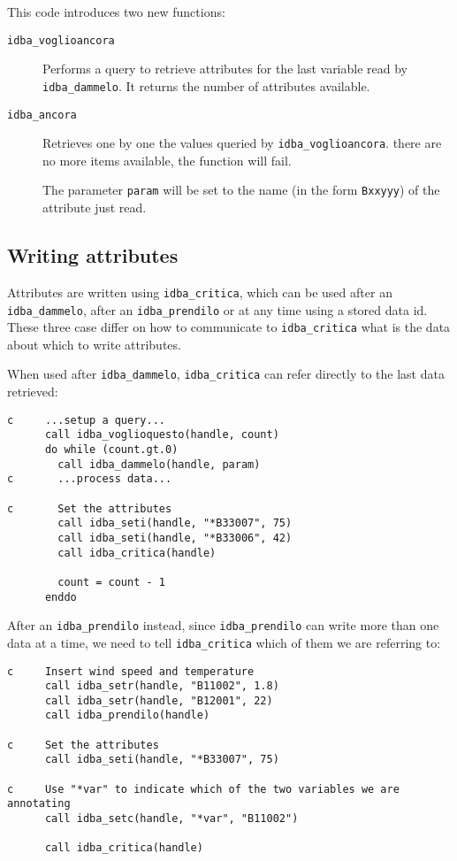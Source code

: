 \documentclass[draft,12pt,a4paper,twoside]{book}
\begin{document}
This code introduces two new functions:

\begin{description}
\item[{\tt idba\_voglioancora}]
  Performs a query to retrieve attributes for the last variable read by
  {\tt idba\_dammelo}.  It returns the number of attributes available.
\item[{\tt idba\_ancora}]
  Retrieves one by one the values queried by {\tt idba\_voglioancora}.
  there are no more items available, the function will fail.

  The parameter {\tt param} will be set to the name (in the form {\tt *Bxxyyy}) of
  the attribute just read.
\end{description}

\subsection{Writing attributes}

\label{fun-idba_critica}

Attributes are written using {\tt idba\_critica}, which can be used after an
{\tt idba\_dammelo}, after an {\tt idba\_prendilo} or at any time using a stored data
id.  These three case differ on how to communicate to {\tt idba\_critica} what is
the data about which to write attributes.

When used after {\tt idba\_dammelo}, {\tt idba\_critica} can refer directly to the
last data retrieved:

\begin{verbatim}
c     ...setup a query...
      call idba_voglioquesto(handle, count)
      do while (count.gt.0)
        call idba_dammelo(handle, param)
c       ...process data...

c       Set the attributes
        call idba_seti(handle, "*B33007", 75)
        call idba_seti(handle, "*B33006", 42)
        call idba_critica(handle)

        count = count - 1
      enddo
\end{verbatim}

After an {\tt idba\_prendilo} instead, since {\tt idba\_prendilo} can write more than
one data at a time, we need to tell {\tt idba\_critica} which of them we are
referring to:

\begin{verbatim}
c     Insert wind speed and temperature
      call idba_setr(handle, "B11002", 1.8)
      call idba_setr(handle, "B12001", 22)
      call idba_prendilo(handle)

c     Set the attributes
      call idba_seti(handle, "*B33007", 75)

c     Use "*var" to indicate which of the two variables we are annotating
      call idba_setc(handle, "*var", "B11002")

      call idba_critica(handle)
\end{verbatim}
\end{document}

